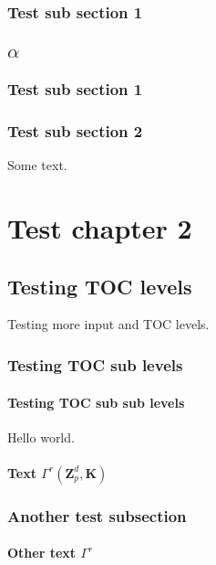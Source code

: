 \documentclass{book}
\begin{document}

\subsection{Test sub section 1}

\section{$\alpha$}

\subsection{Test sub section 1}

\subsection{Test sub section 2}
Some text.

\chapter{Test chapter 2}

\section{Testing TOC levels}
Testing more input and TOC levels.

\subsection{Testing TOC sub levels}

\subsubsection{Testing TOC sub sub levels}
Hello world.

\subsubsection{Text $\Gamma^{r}(\ensuremath{{\mathbf{Z}}}_p^d,\mathbf{K})$}

\subsection{Another test subsection}

\subsubsection{Other text $\Gamma^{r}$}
\end{document}

